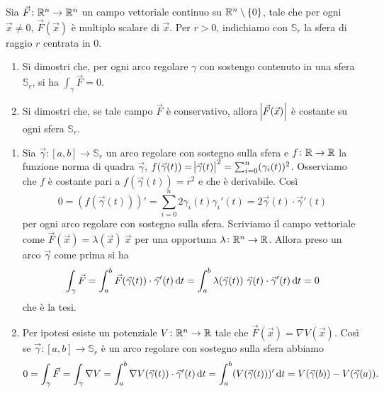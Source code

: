 \documentclass[a4paper]{article}\par \usepackage{style}\par
\begin{document}
\begin{vares}
  Sia $ \vec{F} \colon \mathbb{R}^n \to \mathbb{R}^n $ un campo vettoriale continuo su $ \mathbb{R}^n \setminus \{0\} $, tale che per ogni $ \vec{x} \neq 0 $, $ \vec{F}(\vec{x}) $ è multiplo scalare di $ \vec{x} $. Per $ r > 0 $, indichiamo con $ \mathbb{S}_r $ la sfera di raggio $ r $ centrata in 0.
  \begin{enumerate}[label = (\roman*)]
  \item Si dimostri che, per ogni arco regolare $ \gamma $ con sostengo contenuto in una sfera $ \mathbb{S}_r $, si ha $ \int_{\gamma} \vec{F} = 0 $.
  \item Si dimostri che, se tale campo $ \vec{F} $ è conservativo, allora $ \abs{\vec{F}(\vec{x})} $ è costante su ogni sfera $ \mathbb{S}_r $.
  \end{enumerate}
\end{vares}\par \begin{enumerate}[label = (\roman*)]
\item Sia $ \vec{\gamma} \colon [a, b] \to \mathbb{S}_r $ un arco regolare con sostegno sulla sfera e $ f \colon \mathbb{R} \to \mathbb{R} $ la funzione norma di quadra $ \vec{\gamma} $,  $ f(\vec{\gamma}(t)) = \abs{\vec{\gamma}(t)}^2 = \sum_{i = 0}^{n} (\gamma_i(t))^2 $. Osserviamo che $ f $ è costante pari a $ f(\vec{\gamma}(t)) = r^2 $ e che è derivabile. Così
  \begin{equation*}
    0 = (f(\vec{\gamma}(t)))' = \sum_{i = 0}^{n} 2 \gamma_i(t) \gamma_i'(t) = 2 \vec{\gamma}(t) \cdot \vec{\gamma}'(t)
  \end{equation*}
  per ogni arco regolare con sostegno sulla sfera. Scriviamo il campo vettoriale come $ \vec{F}(\vec{x}) = \lambda(\vec{x}) \ \vec{x} $ per una opportuna $ \lambda \colon \mathbb{R}^n \to \mathbb{R} $. Allora preso un arco $ \vec{\gamma} $ come prima si ha \[\int_{\gamma} \vec{F} = \int_{a}^{b} \vec{F}(\vec{\gamma}(t)) \cdot \vec{\gamma}'(t) \dif{t} = \int_{a}^{b} \lambda(\vec{\gamma}(t)) \  \vec{\gamma}(t) \cdot \vec{\gamma}'(t) \dif{t} = 0\] che è la tesi.
\item Per ipotesi esiste un potenziale $ V \colon \mathbb{R}^n \to \mathbb{R} $ tale che $ \vec{F}(\vec{x}) = \nabla{V(\vec{x})} $. Così se $ \vec{\gamma} \colon [a, b] \to \mathbb{S}_r $ è un arco regolare con sostegno sulla sfera abbiamo
  \begin{equation*}
    0 = \int_{\gamma} \vec{F} = \int_{\gamma} \nabla{V} = \int_{a}^{b} \nabla{V}(\vec{\gamma}(t)) \cdot \vec{\gamma}'(t) \dif{t} = \int_{a}^{b} (V(\vec{\gamma}(t)))' \dif{t} = V(\vec{\gamma}(b)) - V(\vec{\gamma}(a)).

\end{equation*}
\end{enumerate}
\end{document}
